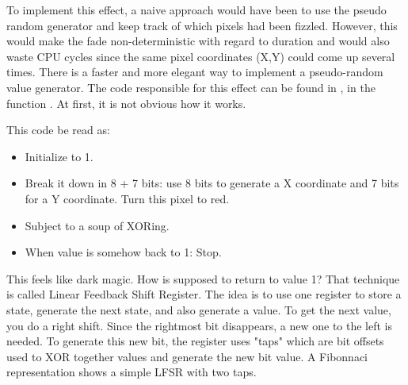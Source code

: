 To implement this effect, a naive approach would have been to use the pseudo random generator  and keep track of which pixels had been fizzled. However, this would make the fade non-deterministic with regard to duration and would also waste CPU cycles since the same pixel coordinates (X,Y) could come up several times. There is a faster and more elegant way to implement a pseudo-random value generator. The code responsible for this effect can be found in , in the function . At first, it is not obvious how it works.\\
\par
\begin{minipage}{\textwidth}

\end{minipage}
\par
This code be read as:\\
\begin{itemize}
\item Initialize  to 1.
\item Break it down in 8 + 7 bits: use 8 bits to generate a X coordinate and 7 bits for a Y coordinate. Turn this pixel to red.
\item Subject  to a soup of XORing.
\item When  value is somehow back to 1: Stop.
\end{itemize}        
This feels like dark magic. How is  supposed to return to value 1? That technique is called Linear Feedback Shift Register. The idea is to use one register to store a state, generate the next state, and also generate a value. To get the next value, you do a right shift. Since the rightmost bit disappears, a new one to the left is needed. To generate this new bit, the register uses "taps" which are bit offsets used to XOR together values and generate the new bit value. A Fibonnaci representation shows a simple LFSR with two taps.\\
\par

